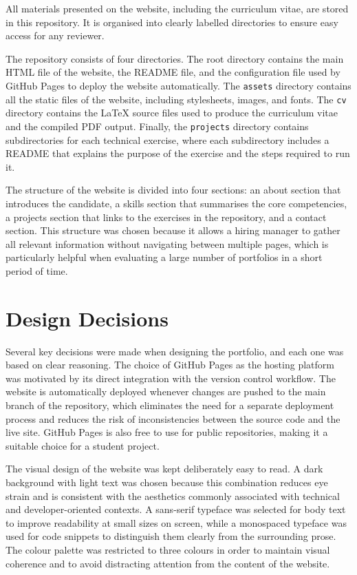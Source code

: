 \documentclass[12pt,a4paper]{article}
\begin{document}
 All materials presented on the website, including the curriculum vitae, are stored in this repository. It is organised into clearly labelled directories to ensure easy access for any reviewer.

The repository consists of four directories. The root directory contains the main HTML file of the website, the README file, and the configuration file used by GitHub Pages to deploy the website automatically. The \texttt{assets} directory contains all the static files of the website, including stylesheets, images, and fonts. The \texttt{cv} directory contains the \LaTeX{} source files used to produce the curriculum vitae and the compiled PDF output. Finally, the \texttt{projects} directory contains subdirectories for each technical exercise, where each subdirectory includes a README that explains the purpose of the exercise and the steps required to run it.

The structure of the website is divided into four sections: an about section that introduces the candidate, a skills section that summarises the core competencies, a projects section that links to the exercises in the repository, and a contact section. This structure was chosen because it allows a hiring manager to gather all relevant information without navigating between multiple pages, which is particularly helpful when evaluating a large number of portfolios in a short period of time.

\section{Design Decisions}

Several key decisions were made when designing the portfolio, and each one was based on clear reasoning. The choice of GitHub Pages as the hosting platform was motivated by its direct integration with the version control workflow. The website is automatically deployed whenever changes are pushed to the main branch of the repository, which eliminates the need for a separate deployment process and reduces the risk of inconsistencies between the source code and the live site. GitHub Pages is also free to use for public repositories, making it a suitable choice for a student project.

The visual design of the website was kept deliberately easy to read. A dark background with light text was chosen because this combination reduces eye strain and is consistent with the aesthetics commonly associated with technical and developer-oriented contexts. A sans-serif typeface was selected for body text to improve readability at small sizes on screen, while a monospaced typeface was used for code snippets to distinguish them clearly from the surrounding prose. The colour palette was restricted to three colours in order to maintain visual coherence and to avoid distracting attention from the content of the website.
\end{document}

